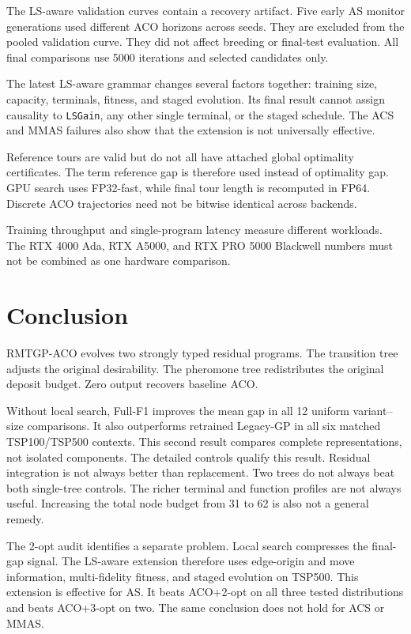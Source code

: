 \documentclass[letterpaper,journal]{IEEEtran}
\begin{document}
The LS-aware validation curves contain a recovery artifact.
Five early AS monitor generations used different ACO horizons across seeds.
They are excluded from the pooled validation curve.
They did not affect breeding or final-test evaluation.
All final comparisons use 5000 iterations and selected candidates only.

The latest LS-aware grammar changes several factors together:
training size, capacity, terminals, fitness, and staged evolution.
Its final result cannot assign causality to \texttt{LSGain}, any other single
terminal, or the staged schedule.
The ACS and MMAS failures also show that the extension is not universally
effective.

Reference tours are valid but do not all have attached global optimality
certificates.
The term reference gap is therefore used instead of optimality gap.
GPU search uses FP32-fast, while final tour length is recomputed in FP64.
Discrete ACO trajectories need not be bitwise identical across backends.

Training throughput and single-program latency measure different workloads.
The RTX 4000 Ada, RTX A5000, and RTX PRO 5000 Blackwell numbers must not be
combined as one hardware comparison.

\section{Conclusion}

RMTGP-ACO evolves two strongly typed residual programs.
The transition tree adjusts the original desirability.
The pheromone tree redistributes the original deposit budget.
Zero output recovers baseline ACO.

Without local search, Full-F1 improves the mean gap in all 12 uniform
variant--size comparisons.
It also outperforms retrained Legacy-GP in all six matched TSP100/TSP500
contexts.
This second result compares complete representations, not isolated
components.
The detailed controls qualify this result.
Residual integration is not always better than replacement.
Two trees do not always beat both single-tree controls.
The richer terminal and function profiles are not always useful.
Increasing the total node budget from 31 to 62 is also not a general remedy.

The 2-opt audit identifies a separate problem.
Local search compresses the final-gap signal.
The LS-aware extension therefore uses edge-origin and move information,
multi-fidelity fitness, and staged evolution on TSP500.
This extension is effective for AS.
It beats ACO+2-opt on all three tested distributions and beats ACO+3-opt on
two.
The same conclusion does not hold for ACS or MMAS.
\end{document}
